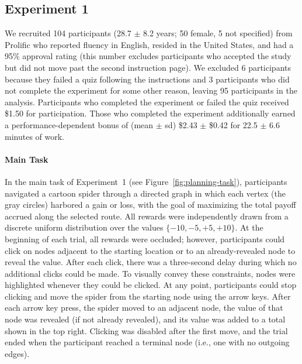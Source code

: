 \subsection{Experiment 1} \label{sec:planning-methods1}
We recruited 104 participants (28.7 $\pm$ 8.2 years; 50 female, 5 not specified) from Prolific who reported fluency in English, resided in the United States, and had a 95\% approval rating (this number excludes participants who accepted the study but did not move past the second instruction page). We excluded 6 participants because they failed a quiz following the instructions and 3 participants who did not complete the experiment for some other reason, leaving 95 participants in the analysis. Participants who completed the experiment or failed the quiz received \$1.50 for participation. Those who completed the experiment additionally earned a performance-dependent bonus of (mean $\pm$ sd) \$2.43 $\pm$ \$0.42 for 22.5 $\pm$ 6.6 minutes of work.

\paragraph{Main Task}
In the main task of Experiment~1 (see Figure~\ref{fig:planning-task}), participants navigated a cartoon spider through a directed graph in which each vertex (the gray circles) harbored a gain or loss, with the goal of maximizing the total payoff accrued along the selected route. All rewards were independently drawn from a discrete uniform distribution over the values $\{-10,-5, +5, +10\}$. At the beginning of each trial, all rewards were occluded; however, participants could click on nodes adjacent to the starting location or to an already-revealed node to reveal the value. After each click, there was a three-second delay during which no additional clicks could be made. To visually convey these constraints, nodes were highlighted whenever they could be clicked. At any point, participants could stop clicking and move the spider from the starting node using the arrow keys. After each arrow key press, the spider moved to an adjacent node, the value of that node was revealed (if not already revealed), and its value was added to a total shown in the top right. Clicking was disabled after the first move, and the trial ended when the participant reached a terminal node (i.e., one with no outgoing edges).

